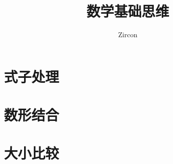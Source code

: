 \documentclass[oneside]{book}
\def\notetitle{数学基础思维}
\def\noteauthor{Zircon}
\def\notedate{}
\begin{document}
\title{\heiti \LARGE \notetitle \vspace*{8\baselineskip}}
\author{\noteauthor}
\date{\notedate}

\maketitle
\newpage

\setcounter{tocdepth}{1}
\tableofcontents
\newpage

\part{式子处理}







\part{数形结合}




\part{大小比较}


\end{document}
